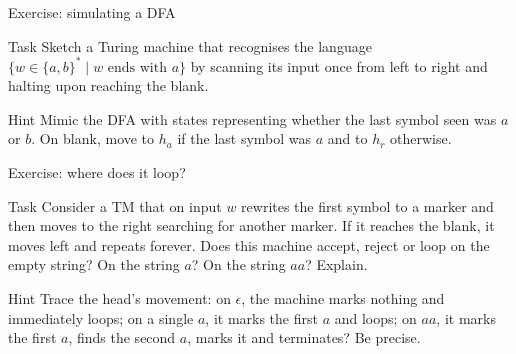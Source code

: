 \begin{frame}[t]{Exercise: simulating a DFA}
  \begin{tblock}{Task}
    Sketch a Turing machine that recognises the language $\{ w \in
    \{a,b\}^* \mid w \text{ ends with } a \}$ by scanning its input
    once from left to right and halting upon reaching the blank.
  \end{tblock}
  \begin{talert}{Hint}
    Mimic the DFA with states representing whether the last symbol
    seen was $a$ or $b$.  On blank, move to $h_a$ if the last symbol
    was $a$ and to $h_r$ otherwise.
  \end{talert}
  \label{fr:7.2-11}
\end{frame}

\begin{frame}[t]{Exercise: where does it loop?}
  \begin{tblock}{Task}
    Consider a TM that on input $w$ rewrites the first symbol to a
    marker and then moves to the right searching for another marker.
    If it reaches the blank, it moves left and repeats forever.  Does
    this machine accept, reject or loop on the empty string?  On the
    string $a$?  On the string $aa$?  Explain.
  \end{tblock}
  \begin{talert}{Hint}
    Trace the head’s movement: on $\epsilon$, the machine marks
    nothing and immediately loops; on a single $a$, it marks the
    first $a$ and loops; on $aa$, it marks the first $a$, finds the
    second $a$, marks it and terminates?  Be precise.
  \end{talert}
  \label{fr:7.2-12}
\end{frame}

